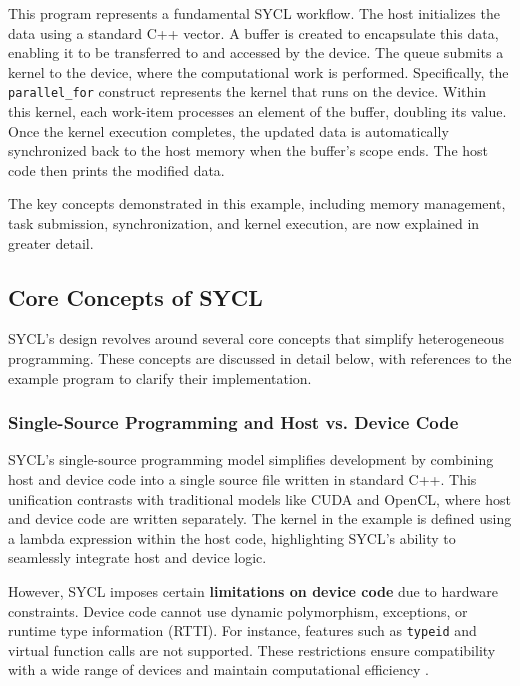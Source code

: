 This program represents a fundamental SYCL workflow. The host initializes the data using a standard C++ vector. A buffer is created
to encapsulate this data, enabling it to be transferred to and accessed by the device. The queue submits a kernel to the device,
where the computational work is performed. Specifically, the \texttt{parallel\_for} construct represents the kernel that runs on the
device. Within this kernel, each work-item processes an element of the buffer, doubling its value. Once the kernel execution
completes, the updated data is automatically synchronized back to the host memory when the buffer's scope ends. The host code then
prints the modified data.

The key concepts demonstrated in this example, including memory management, task submission, synchronization, and kernel execution,
are now explained in greater detail.

\subsection{Core Concepts of SYCL}

SYCL's design revolves around several core concepts that simplify heterogeneous programming. These concepts are discussed in detail
below, with references to the example program to clarify their implementation.

\subsubsection{Single-Source Programming and Host vs. Device Code}

SYCL’s single-source programming model simplifies development by combining host and device code into a single source file written
in standard C++. This unification contrasts with traditional models like CUDA and OpenCL, where host and device code are written
separately. The kernel in the example is defined using a lambda expression within the host code, highlighting SYCL’s ability to
seamlessly integrate host and device logic.

However, SYCL imposes certain \textbf{limitations on device code} due to hardware constraints. Device code cannot use dynamic
polymorphism, exceptions, or runtime type information (RTTI). For instance, features such as \texttt{typeid} and virtual function
calls are not supported. These restrictions ensure compatibility with a wide range of devices and maintain computational efficiency
\cite{reinders2020data}.

